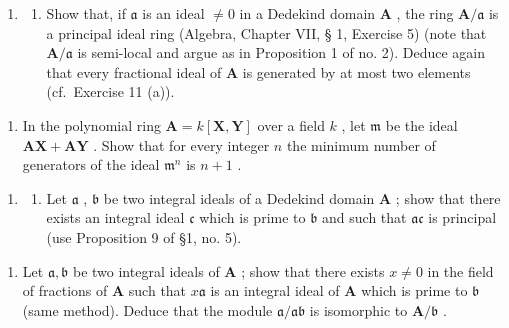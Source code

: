 
\begin{enumerate}
\def\labelenumi{\arabic{enumi}.}
\tightlist
\item
  \begin{enumerate}
  \def\labelenumii{(\alph{enumii})}
  \tightlist
  \item
    Show that, if \(\mathfrak{a}\) is an ideal \(\neq 0\) in a Dedekind domain \(\mathbf{A}\) , the ring \(\mathbf{A} / \mathfrak{a}\) is a principal ideal ring (Algebra, Chapter VII, § 1, Exercise 5) (note that \(\mathbf{A} / \mathfrak{a}\) is semi-local and argue as in Proposition 1 of no. 2). Deduce again that every fractional ideal of \(\mathbf{A}\) is generated by at most two elements (cf.~Exercise 11 (a)).
  \end{enumerate}
\end{enumerate}

\begin{enumerate}
\def\labelenumi{(\alph{enumi})}
\setcounter{enumi}{1}
\tightlist
\item
  In the polynomial ring \(\mathbf{A} = k[\mathbf{X},\mathbf{Y}]\) over a field \(k\) , let \(\mathfrak{m}\) be the ideal \(\mathbf{AX} + \mathbf{AY}\) . Show that for every integer \(n\) the minimum number of generators of the ideal \(\mathfrak{m}^n\) is \(n + 1\) .
\end{enumerate}

\begin{enumerate}
\def\labelenumi{\arabic{enumi}.}
\setcounter{enumi}{1}
\tightlist
\item
  \begin{enumerate}
  \def\labelenumii{(\alph{enumii})}
  \tightlist
  \item
    Let \(\mathfrak{a}\) , \(\mathfrak{b}\) be two integral ideals of a Dedekind domain \(\mathbf{A}\) ; show that there exists an integral ideal \(\mathfrak{c}\) which is prime to \(\mathfrak{b}\) and such that \(\mathfrak{ac}\) is principal (use Proposition 9 of §1, no. 5).
  \end{enumerate}
\end{enumerate}

\begin{enumerate}
\def\labelenumi{(\alph{enumi})}
\setcounter{enumi}{1}
\tightlist
\item
  Let \(\mathfrak{a}, \mathfrak{b}\) be two integral ideals of \(\mathbf{A}\) ; show that there exists \(x \neq 0\) in the field of fractions of \(\mathbf{A}\) such that \(x\mathfrak{a}\) is an integral ideal of \(\mathbf{A}\) which is prime to \(\mathfrak{b}\) (same method). Deduce that the module \(\mathfrak{a}/\mathfrak{ab}\) is isomorphic to \(\mathbf{A}/\mathfrak{b}\) .
\end{enumerate}

